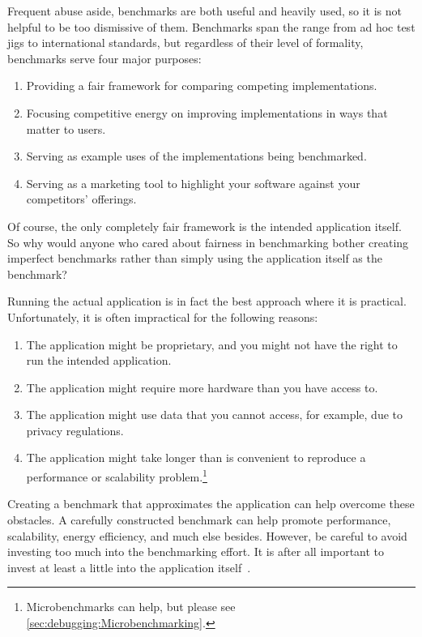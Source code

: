 Frequent abuse aside, benchmarks are both useful and heavily used,
so it is not helpful to be too dismissive of them.
Benchmarks span the range from ad hoc test jigs to international
standards, but regardless of their level of formality, benchmarks
serve four major purposes:

\begin{enumerate}
\item	Providing a fair framework for comparing competing implementations.
\item	Focusing competitive energy on improving implementations in ways
	that matter to users.
\item	Serving as example uses of the implementations being benchmarked.
\item	Serving as a marketing tool to highlight your software
	against your competitors' offerings.
\end{enumerate}

Of course,  the only completely fair framework is the intended
application itself.
So why would anyone who cared about fairness in benchmarking
bother creating imperfect benchmarks rather than simply
using the application itself as the benchmark?

Running the actual application is in fact the best approach where it is practical.
Unfortunately, it is often impractical for the following reasons:

\begin{enumerate}
\item	The application might be proprietary, and you
	might not have the right to run the intended application.
\item	The application might require more hardware
	than you have access to.
\item	The application might use data that you cannot
	access, for example, due to privacy regulations.
\item	The application might take longer than is convenient to
	reproduce a performance or scalability problem.\footnote{
		Microbenchmarks can help, but
		please see \cref{sec:debugging:Microbenchmarking}.}
\end{enumerate}

Creating a benchmark that approximates
the application can help overcome these obstacles.
A carefully constructed benchmark can help promote performance,
scalability, energy efficiency, and much else besides.
However, be careful to avoid investing too much into the benchmarking
effort.
It is after all important to invest at least a little into the
application itself~\cite{Gray91}.

